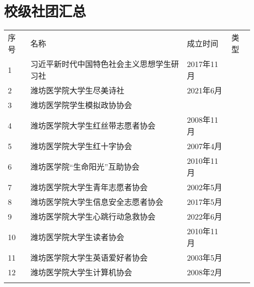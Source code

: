 \chapter[校级社团汇总]{校级社团汇总}
\label{community_summary}
\begin{center}
    \begin{tabular}{|>{\centering\arraybackslash}p{2em}|>{\centering\arraybackslash}p{20em}|%
        >{\centering\arraybackslash}p{6em}|>{\centering\arraybackslash}p{5em}|}
        \Xhline{1.2pt}
        序号 & 名称                            & 成立时间     & 类型                     \\
        \Xhline{1.2pt}
        1  & \small{习近平新时代中国特色社会主义思想学生研习社} & 2017年11月 & \multirow{3}{*}{思想政治类} \\
        \cline{1-3}
        2  & 潍坊医学院大学生尽美诗社                  & 2021年6月  &                        \\
        \cline{1-3}
        3  & 潍坊医学院学生模拟政协协会                 &          &                        \\
        \Xhline{1.2pt}
        4  & 潍坊医学院大学生红丝带志愿者协会              & 2008年11月 & \multirow{6}{*}{志愿公益类} \\
        \cline{1-3}
        5  & 潍坊医学院大学生红十字协会                 & 2007年4月  &                        \\
        \cline{1-3}
        6  & 潍坊医学院“生命阳光”互助协会               & 2010年11月 &                        \\
        \cline{1-3}
        7  & 潍坊医学院大学生青年志愿者协会               & 2002年5月  &                        \\
        \cline{1-3}
        8  & 潍坊医学院大学生信息安全志愿者协会             & 2017年5月  &                        \\
        \cline{1-3}
        9  & 潍坊医学院大学生心跳行动急救协会              & 2022年6月  &                        \\
        \Xhline{1.2pt}
        10 & 潍坊医学院大学生读者协会                  & 2010年11月 & \multirow{5}{*}{学术科技类} \\
        \cline{1-3}
        11 & 潍坊医学院大学生英语爱好者协会               & 2003年5月  &                        \\
        \cline{1-3}
        12 & 潍坊医学院大学生计算机协会                 & 2008年2月  &                        \\
        \cline{1-3}

\end{tabular}
\end{center}
